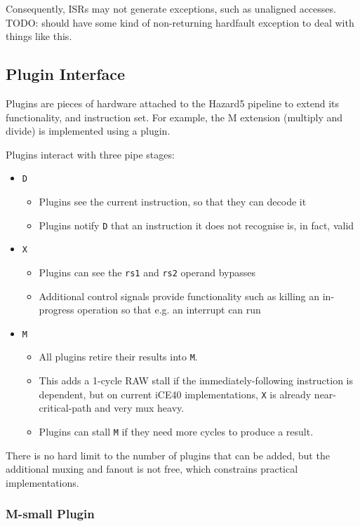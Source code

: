 Consequently, ISRs may not generate exceptions, such as unaligned accesses. TODO: should have some kind of non-returning hardfault exception to deal with things like this.

\subsection{Plugin Interface}

Plugins are pieces of hardware attached to the Hazard5 pipeline to extend its functionality, and instruction set. For example, the M extension (multiply and divide) is implemented using a plugin.

Plugins interact with three pipe stages:

\begin{itemize}
	\item {\tt D}
	\begin{itemize}
		\item Plugins see the current instruction, so that they can decode it
		\item Plugins notify {\tt D} that an instruction it does not recognise is, in fact, valid
	\end{itemize}
	\item {\tt X}
	\begin{itemize}
		\item Plugins can see the {\tt rs1} and {\tt rs2} operand bypasses
		\item Additional control signals provide functionality such as killing an in-progress operation so that e.g. an interrupt can run
	\end{itemize}
	\item {\tt M}
	\begin{itemize}
		\item All plugins retire their results into {\tt M}.
		\item This adds a 1-cycle RAW stall if the immediately-following instruction is dependent, but on current iCE40 implementations, {\tt X} is already near-critical-path and very mux heavy.
		\item Plugins can stall {\tt M} if they need more cycles to produce a result.
	\end{itemize}
\end{itemize}

There is no hard limit to the number of plugins that can be added, but the additional muxing and fanout is not free, which constrains practical implementations.

\subsubsection{M-small Plugin}

